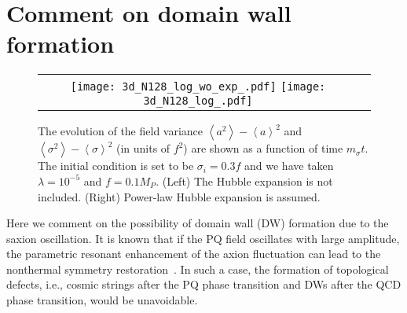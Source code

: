 \documentclass[12pt, a4paper]{article}
\begin{document}
\section{Comment on domain wall formation}  \label{sec:DW}


\begin{figure}[t]
\begin{center}
\begin{tabular}{cc}
\texttt{[image: 3d\_N128\_log\_wo\_exp\_.pdf]}
\hspace{3mm}
\texttt{[image: 3d\_N128\_log\_.pdf]}
\end{tabular}
\end{center}
\caption {
The evolution of the field variance $\left< a^2 \right> - \left< a \right>^2$ and $\left< \sigma^2 \right> - \left< \sigma \right>^2$
(in units of $f^2$) are shown as a function of time $m_{\sigma}t$.
The initial condition is set to be $\sigma_i = 0.3 f$ and we have taken $\lambda = 10^{-5}$ and $f = 0.1 M_P$.
(Left) The Hubble expansion is not included.
(Right) Power-law Hubble expansion is assumed.
}
\label{fig:lattice}
\end{figure}


Here we comment on the possibility of domain wall (DW) formation due to the saxion oscillation.
It is known that if the PQ field oscillates with large amplitude, the parametric resonant enhancement of the axion fluctuation
can lead to the nonthermal symmetry restoration~\cite{Kofman:1995fi,Kasuya:1996ns,Kasuya:1997ha,Kawasaki:2013iha}.
In such a case, the formation of topological defects, i.e., cosmic strings after the PQ phase transition and DWs after the QCD phase transition, would be unavoidable.
 
\end{document}

